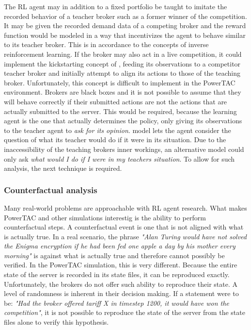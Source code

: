 The \ac{RL} agent may in addition to a fixed portfolio be taught to imitate the recorded behavior of a teacher broker
such as a former winner of the competition. It may be given the recorded demand data of a competing broker and the
reward function would be modeled in a way that incentivizes the agent to behave similar to its teacher broker. This is
in accordance to the concepts of inverse reinforcement learning. If the broker may also act in a live competition, it
could implement the kickstarting concept of \citet{schmitt2018kickstarting}, feeding its observations to a competitor
teacher broker and initially attempt to align its actions to those of the teaching broker. Unfortunately, this concept is difficult to
implement in the \ac{PowerTAC} environment. Brokers are black boxes and it is not possible to assume that they will
behave correctly if their submitted actions are not the actions that are actually submitted to the server. This would be
required, because the learning agent is the one that actually determines the policy, only giving its observations to the
teacher agent to \emph{ask for its opinion}. \citet{schmitt2018kickstarting} model lets the agent consider the question
of what its teacher would do if it were in its situation. Due to the inaccessibility of the teaching brokers inner
workings, an alternative model could only ask \emph{what would I do if I were in my teachers situation}. To allow for
such analysis, the next technique is required.

\subsubsection{Counterfactual analysis}%
\label{ssub:counterfactual_analysis}

Many real-world problems are approachable with \ac{RL} agent research. What makes \ac{PowerTAC} and other simulations
interestig is the ability to perform counterfactual steps. A counterfactual event is one that is not aligned with what
is actually true. In a real scenario, the phrase \emph{"Alan Turing would have not solved the Enigma encryption if he
had been fed one apple a day by his mother every morning"} is against what is actually true and therefore cannot
possibly be verified. In the \ac{PowerTAC} simulation, this is very different. Because the entire state of the server is
recorded in its state files, it can be reproduced exactly. Unfortunately, the brokers do not offer such ability to
reproduce their state. A level of randomness is inherent in their decision making. If a statement were to be: \emph{"Had
the broker offered tariff X in timestep 1200, it would have won the competition"}, it is not possible to reproduce the
state of the server from the state files alone to verify this hypothesis.

